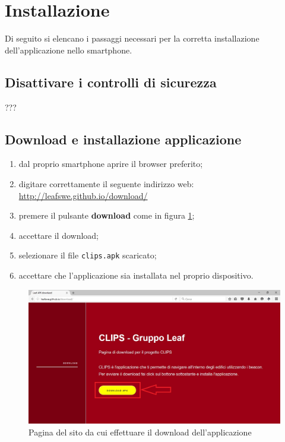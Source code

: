 \documentclass[../ClipsManualeUtente.tex]{subfiles}
\begin{document}
\section{Installazione}
	Di seguito si elencano i passaggi necessari per la corretta installazione dell'applicazione nello smartphone.
	
		\subsection{Disattivare i controlli di sicurezza}
			???

		\subsection{Download e installazione applicazione}		
		\begin{enumerate}
			\item dal proprio smartphone aprire il browser preferito;
			\item digitare correttamente il seguente indirizzo web: \\
				\url{http://leafswe.github.io/download/}
			\item premere il pulsante \textbf{download} come in figura \ref{fig:DownloadApplicazioneSito};
			\item accettare il download;
			\item selezionare il file \lstinline|clips.apk| scaricato;
			\item accettare che l'applicazione sia installata nel proprio dispositivo.
		\end{enumerate}
		
		\begin{figure} [h]
			\centering
			\includegraphics[width=\textwidth]{img/DownloadApplicazioneSito}
			\caption{Pagina del sito da cui effettuare il download dell'applicazione}
			\label{fig:DownloadApplicazioneSito}
		\end{figure}
		
\end{document}
